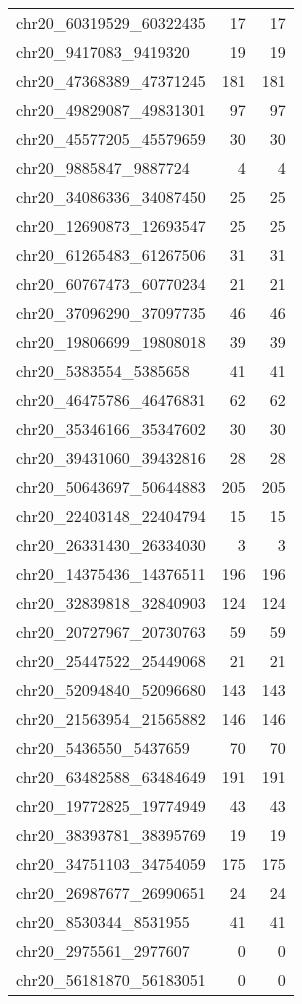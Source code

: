 \begin{longtable}{lrr}
chr20_60319529_60322435 & 17 & 17 \\
chr20_9417083_9419320 & 19 & 19 \\
chr20_47368389_47371245 & 181 & 181 \\
chr20_49829087_49831301 & 97 & 97 \\
chr20_45577205_45579659 & 30 & 30 \\
chr20_9885847_9887724 & 4 & 4 \\
chr20_34086336_34087450 & 25 & 25 \\
chr20_12690873_12693547 & 25 & 25 \\
chr20_61265483_61267506 & 31 & 31 \\
chr20_60767473_60770234 & 21 & 21 \\
chr20_37096290_37097735 & 46 & 46 \\
chr20_19806699_19808018 & 39 & 39 \\
chr20_5383554_5385658 & 41 & 41 \\
chr20_46475786_46476831 & 62 & 62 \\
chr20_35346166_35347602 & 30 & 30 \\
chr20_39431060_39432816 & 28 & 28 \\
chr20_50643697_50644883 & 205 & 205 \\
chr20_22403148_22404794 & 15 & 15 \\
chr20_26331430_26334030 & 3 & 3 \\
chr20_14375436_14376511 & 196 & 196 \\
chr20_32839818_32840903 & 124 & 124 \\
chr20_20727967_20730763 & 59 & 59 \\
chr20_25447522_25449068 & 21 & 21 \\
chr20_52094840_52096680 & 143 & 143 \\
chr20_21563954_21565882 & 146 & 146 \\
chr20_5436550_5437659 & 70 & 70 \\
chr20_63482588_63484649 & 191 & 191 \\
chr20_19772825_19774949 & 43 & 43 \\
chr20_38393781_38395769 & 19 & 19 \\
chr20_34751103_34754059 & 175 & 175 \\
chr20_26987677_26990651 & 24 & 24 \\
chr20_8530344_8531955 & 41 & 41 \\
chr20_2975561_2977607 & 0 & 0 \\
chr20_56181870_56183051 & 0 & 0 \\

\end{longtable}
